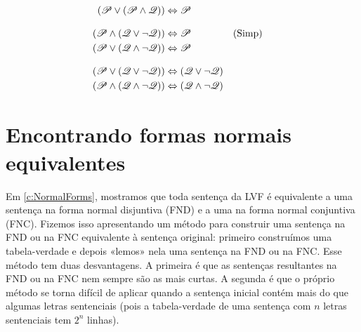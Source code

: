\begin{table}
\begin{align*}
(\mathscr{P} \lor (\mathscr{P} \land \mathscr{Q})) & \Leftrightarrow \mathscr{P}\\[2ex]
(\mathscr{P} \land (\mathscr{Q} \lor \lnot\mathscr{Q})) & \Leftrightarrow \mathscr{P}  && \text{(Simp)}\\
(\mathscr{P} \lor (\mathscr{Q} \land \lnot\mathscr{Q})) & \Leftrightarrow \mathscr{P}\\[2ex]
(\mathscr{P} \lor (\mathscr{Q} \lor \lnot\mathscr{Q})) & \Leftrightarrow (\mathscr{Q} \lor \lnot\mathscr{Q}) \\
(\mathscr{P} \land (\mathscr{Q} \land \lnot\mathscr{Q})) & \Leftrightarrow (\mathscr{Q} \land \lnot\mathscr{Q})
\end{align*}
\caption{Equivalências básicas}
\label{tab:equivalences}
\end{table}

\section{Encontrando formas normais equivalentes}

Em \cref{c:NormalForms}, mostramos que toda sentença da LVF é equivalente a uma sentença na forma normal disjuntiva (FND) e a uma na forma normal conjuntiva (FNC). Fizemos isso apresentando um método para construir uma sentença na FND ou na FNC equivalente à sentença original: primeiro construímos uma tabela-verdade e depois «lemos» nela uma sentença na FND ou na FNC. Esse método tem duas desvantagens. A primeira é que as sentenças resultantes na FND ou na FNC nem sempre são as mais curtas. A segunda é que o próprio método se torna difícil de aplicar quando a sentença inicial contém mais do que algumas letras sentenciais (pois a tabela-verdade de uma sentença com $n$ letras sentenciais tem $2^n$ linhas).

